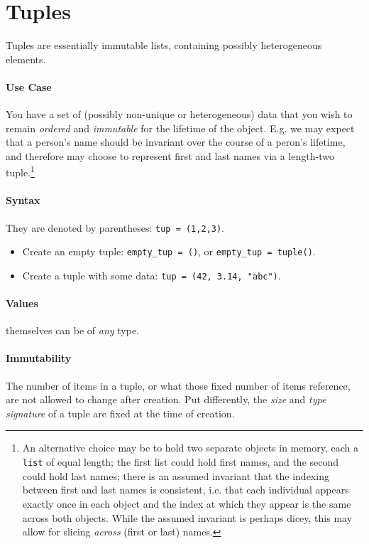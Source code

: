 \documentclass[12pt,letterpaper,twoside]{article}
\begin{document}
\section{Tuples}

Tuples are essentially immutable lists, containing possibly heterogeneous elements.

\paragraph{Use Case} You have a set of (possibly non-unique or heterogeneous) data that you
wish to remain \emph{ordered} and \emph{immutable} for the lifetime of the object. E.g. we
may expect that a person's name should be invariant over the course of a peron's lifetime,
and therefore may choose to represent first and last names via a length-two tuple.\footnote{An alternative
choice may be to hold two separate objects in memory, each a \texttt{list} of equal length; the first list
could hold first names, and the second could hold last names; there is an assumed invariant
that the indexing between first and last names is consistent, i.e. that each individual appears exactly once in each
object and the index at which they appear is the same across both objects. While the assumed invariant is perhaps dicey,
this may allow for slicing \emph{across} (first or last) names.}

\paragraph{Syntax}
They are denoted by parentheses: \texttt{tup\ =\ (1,2,3)}.

\begin{itemize}
  \item Create an empty tuple: \texttt{empty\_tup = ()}, or \texttt{empty\_tup = tuple()}.
  \item Create a tuple with some data: \texttt{tup = (42, 3.14, "abc")}.
\end{itemize}

\paragraph{Values} themselves can be of \emph{any} type.
\vspace{-12pt}
\paragraph{Immutability} The number of items in a tuple, or what those fixed number of items reference, are not allowed to change
after creation. Put differently, the \emph{size} and \emph{type signature} of a tuple are fixed at the time of creation.
\end{document}
